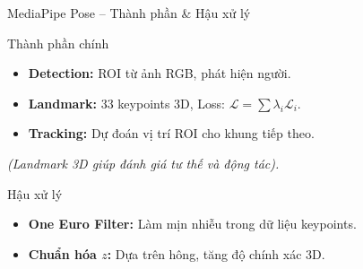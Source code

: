 \begin{frame}{MediaPipe Pose – Thành phần & Hậu xử lý}
    \begin{exampleblock}{Thành phần chính}
        \begin{itemize}
            \item \textbf{Detection:} ROI từ ảnh RGB, phát hiện người.
            \item \textbf{Landmark:} 33 keypoints 3D, Loss: $\mathcal{L} = \sum \lambda_i \mathcal{L}_i$.
            \item \textbf{Tracking:} Dự đoán vị trí ROI cho khung tiếp theo.
        \end{itemize}
        \small{\textit{(Landmark 3D giúp đánh giá tư thế và động tác).}}
    \end{exampleblock}

    \begin{alertblock}{Hậu xử lý}
        \begin{itemize}
            \item \textbf{One Euro Filter:} Làm mịn nhiễu trong dữ liệu keypoints.
            \item \textbf{Chuẩn hóa $z$:} Dựa trên hông, tăng độ chính xác 3D.
        \end{itemize}
    \end{alertblock}
\end{frame}

